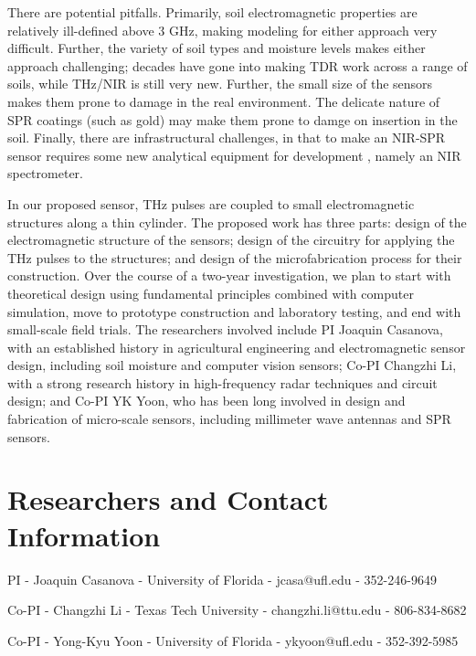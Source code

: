 \documentclass[10pt,letterpaper]{article}
\begin{document}
There are potential pitfalls. Primarily, soil electromagnetic properties are relatively ill-defined above 3 GHz, making modeling for either approach very difficult. Further, the variety of soil types and moisture levels makes either approach challenging; decades have gone into making TDR work across a range of soils, while THz/NIR is still very new. Further, the small size of the sensors makes them prone to damage in the real environment. The delicate nature of SPR coatings (such as gold) may make them prone to damge on insertion in the soil. Finally, there are infrastructural challenges, in that to make an NIR-SPR sensor requires some new analytical equipment for development \cite{ikehata2004surface}, namely an NIR spectrometer.

In our proposed sensor, THz pulses are coupled to small electromagnetic structures along a thin cylinder. The proposed work has three parts: design of the electromagnetic structure of the sensors; design of the circuitry for applying the THz pulses to the structures; and design of the microfabrication process for their construction. Over the course of a two-year investigation, we plan to start with theoretical design using fundamental principles combined with computer simulation, move to prototype construction and laboratory testing, and end with small-scale field trials. The researchers involved include PI Joaquin Casanova, with an established history in agricultural engineering and electromagnetic sensor design, including soil moisture and computer vision sensors; Co-PI Changzhi Li, with a strong research history in high-frequency radar techniques and circuit design; and Co-PI YK Yoon, who has been long involved in design and fabrication of micro-scale sensors, including millimeter wave antennas and SPR sensors. 

\section{Researchers and Contact Information}
\begin{description}
\item{PI} - Joaquin Casanova - University of Florida - jcasa@ufl.edu - 352-246-9649
\item{Co-PI} - Changzhi Li - Texas Tech University - changzhi.li@ttu.edu - 806-834-8682
\item{Co-PI} - Yong-Kyu Yoon -  University of Florida - ykyoon@ufl.edu  - 352-392-5985
\end{description}



  
  
\end{document}

